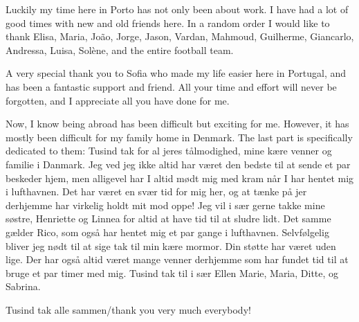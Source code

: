 \documentclass[fleqn]{fcup-thesis}
\begin{document}
\begin{preliminary}
\begin{acknowledgements}
Luckily my time here in Porto has not only been about work. I have had a lot of good times with new
and old friends here. In a random order I would like to thank Elisa, Maria, João, Jorge, Jason,
Vardan, Mahmoud, Guilherme, Giancarlo, Andressa, Luisa, Solène, and the entire football team.

A very special thank you to Sofia who made my life easier here in Portugal, and has been a fantastic
support and friend. All your time and effort will never be forgotten, and I appreciate all you have
done for me.

Now, I know being abroad has been difficult but exciting for me. However, it has mostly been
difficult for my family home in Denmark. The last part is specifically dedicated to them: Tusind tak
for al jeres tålmodighed, mine kære venner og familie i Danmark. Jeg ved jeg ikke altid har været
den bedste til at sende et par beskeder hjem, men alligevel har I altid mødt mig med kram når I har
hentet mig i lufthavnen. Det har været en svær tid for mig her, og at tænke på jer derhjemme har
virkelig holdt mit mod oppe! Jeg vil i sær gerne takke mine søstre, Henriette og Linnea for altid at
have tid til at sludre lidt. Det samme gælder Rico, som også har hentet mig et par gange i
lufthavnen. Selvfølgelig bliver jeg nødt til at sige tak til min kære mormor. Din støtte har været
uden lige. Der har også altid været mange venner derhjemme som har fundet tid til at bruge et par
timer med mig. Tusind tak til i sær Ellen Marie, Maria, Ditte, og Sabrina.

\vspace{7mm}
Tusind tak alle sammen/thank you very much everybody!


\end{acknowledgements}



\begin{abstract}
\lipsum[2]
\end{abstract}

\begin{abstract-pt}
\lipsum[2]
\end{abstract-pt}



\tableofcontents
{}
\listoftables
{}
\listoffigures

\end{preliminary}










\appendix






% 


\nocite{} %
\end{document}
